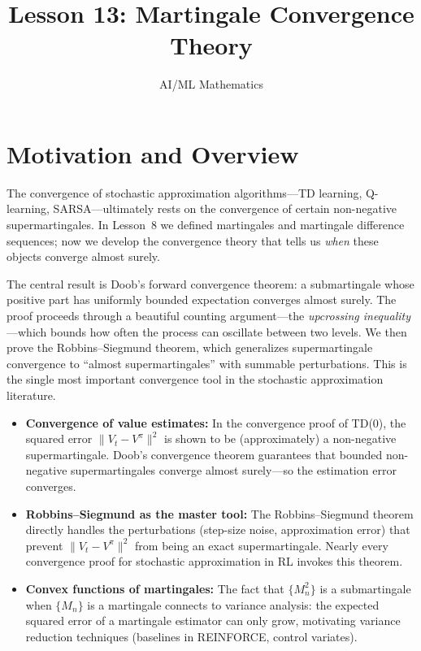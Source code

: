 \documentclass[11pt,a4paper]{article}
\title{Lesson 13: Martingale Convergence Theory}
\author{AI/ML Mathematics}
\date{}
\begin{document}
\maketitle
\tableofcontents
\newpage


\section{Motivation and Overview}
\label{sec:motivation}

The convergence of stochastic approximation algorithms---TD
learning, Q-learning, SARSA---ultimately rests on the
convergence of certain non-negative supermartingales.  In Lesson~8
we defined martingales and martingale difference sequences; now we
develop the convergence theory that tells us \emph{when} these
objects converge almost surely.

The central result is Doob's forward convergence theorem: a
submartingale whose positive part has uniformly bounded
expectation converges almost surely.  The proof proceeds through
a beautiful counting argument---the \emph{upcrossing inequality}
---which bounds how often the process can oscillate between two
levels.  We then prove the Robbins--Siegmund theorem, which
generalizes supermartingale convergence to ``almost
supermartingales'' with summable perturbations.  This is the
single most important convergence tool in the stochastic
approximation literature.

\begin{rlconnection}[title={Why This Matters for RL}]
\begin{itemize}[nosep]
  \item \textbf{Convergence of value estimates:}
    In the convergence proof of TD(0), the squared error
    $\|V_t - V^\pi\|^2$ is shown to be (approximately) a
    non-negative supermartingale.  Doob's convergence theorem
    guarantees that bounded non-negative supermartingales converge
    almost surely---so the estimation error converges.
  \item \textbf{Robbins--Siegmund as the master tool:}
    The Robbins--Siegmund theorem directly handles the
    perturbations (step-size noise, approximation error) that
    prevent $\|V_t - V^\pi\|^2$ from being an exact
    supermartingale.  Nearly every convergence proof for
    stochastic approximation in RL invokes this theorem.
  \item \textbf{Convex functions of martingales:}
    The fact that $\{M_n^2\}$ is a submartingale when $\{M_n\}$
    is a martingale connects to variance analysis: the expected
    squared error of a martingale estimator can only grow,
    motivating variance reduction techniques (baselines in
    REINFORCE, control variates).
\end{itemize}
\end{rlconnection}
\end{document}
